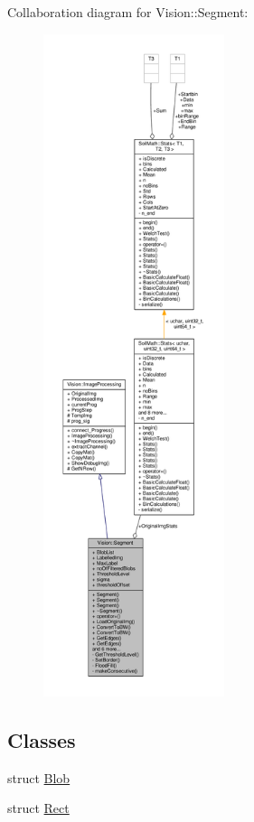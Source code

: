 Collaboration diagram for Vision\+:\+:Segment\+:\nopagebreak
\begin{figure}[H]
\begin{center}
\leavevmode
\includegraphics[height=550pt]{class_vision_1_1_segment__coll__graph}
\end{center}
\end{figure}
\subsection*{Classes}
\begin{DoxyCompactItemize}
\item 
struct \hyperlink{struct_vision_1_1_segment_1_1_blob}{Blob}
\item 
struct \hyperlink{struct_vision_1_1_segment_1_1_rect}{Rect}
\end{DoxyCompactItemize}
